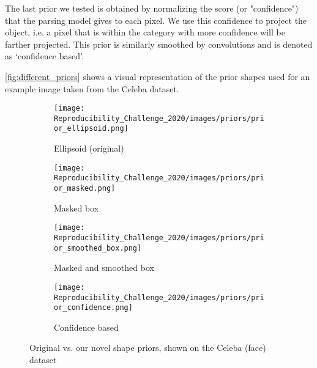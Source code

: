 The last prior we tested is obtained by normalizing the score (or "confidence") that the parsing model gives to each pixel. We use this confidence to project the object, i.e. a pixel that is within the category with more confidence will be farther projected. This prior is similarly smoothed by convolutions and is denoted as `confidence based'. 

\autoref{fig:different_priors} shows a visual representation of the prior shapes used for an example image taken from the Celeba dataset.
\begin{figure}[!htb]
\centering
\begin{subfigure}[t]{0.20\textwidth}
    \texttt{[image: Reproducibility\_Challenge\_2020/images/priors/prior\_ellipsoid.png]}
    \caption{Ellipsoid (original)}
    \label{}
\end{subfigure}
\begin{subfigure}[t]{0.20\textwidth}
    \texttt{[image: Reproducibility\_Challenge\_2020/images/priors/prior\_masked.png]}
    \caption{Masked box}
    \label{}
\end{subfigure}
\begin{subfigure}[t]{0.20\textwidth}
    \texttt{[image: Reproducibility\_Challenge\_2020/images/priors/prior\_smoothed\_box.png]}
    \caption{Masked and  smoothed box
    }
    \label{subfig:c}
\end{subfigure}
\begin{subfigure}[t]{0.20\textwidth}
    \texttt{[image: Reproducibility\_Challenge\_2020/images/priors/prior\_confidence.png]}
    \caption{Confidence based
    }
    \label{subfig:d}
\end{subfigure}
    \caption{Original vs. our novel shape priors, shown on the Celeba (face) dataset}
    \label{fig:different_priors}
\end{figure}


